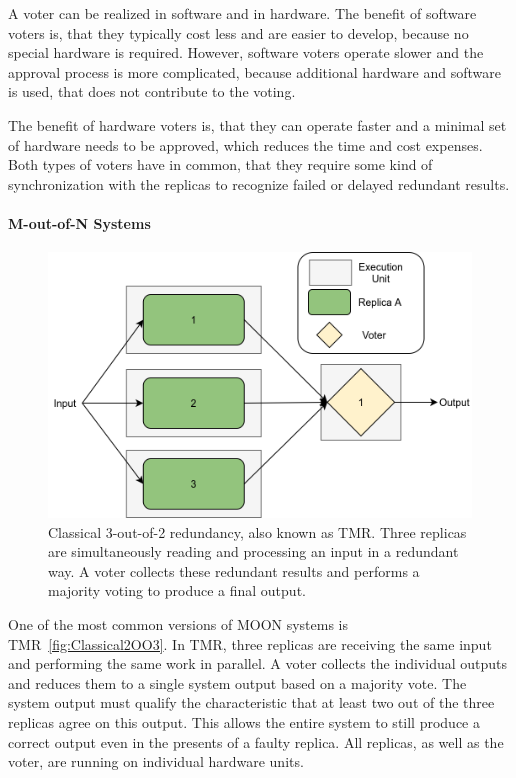 A voter can be realized in software and in hardware.
The benefit of software voters is, that they typically cost less and are easier to develop, because no special hardware is required.
However, software voters operate slower and the approval process is more complicated, because additional hardware and software is used, that does not contribute to the voting.

The benefit of hardware voters is, that they can operate faster and a minimal set of hardware needs to be approved, which reduces the time and cost expenses.
Both types of voters have in common, that they require some kind of synchronization with the replicas to recognize failed or delayed redundant results.

\paragraph{M-out-of-N Systems}
\begin{figure}[!hb]
	\centering
	\includegraphics[width=0.75\linewidth]{images/Classical2OO3}
	\caption{Classical 3-out-of-2 redundancy, also known as \Gls*{TMR}. Three replicas are simultaneously reading and processing an input in a redundant way. A voter collects these redundant results and performs a majority voting to produce a final output.}
	\label{fig:Classical2OO3}
\end{figure}

One of the most common versions of \gls*{MOON} systems is \gls*{TMR}~\autoref{fig:Classical2OO3}.
In \gls*{TMR}, three replicas are receiving the same input and performing the same work in parallel.
A voter collects the individual outputs and reduces them to a single system output based on a majority vote.
The system output must qualify the characteristic that at least two out of the three replicas agree on this output.
This allows the entire system to still produce a correct output even in the presents of a faulty replica.
All replicas, as well as the voter, are running on individual hardware units.

